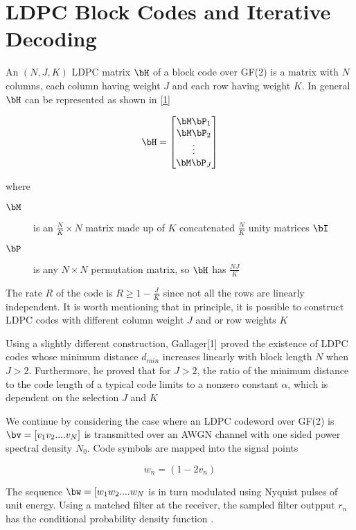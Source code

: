\documentclass[11pt, oneside, dvipdfmx]{book}
\begin{document}
\section{LDPC Block Codes and Iterative  Decoding}
An $(N,J,K)$ LDPC matrix $\bH$ of a block code over GF(2) is a matrix with $N$ columns, each column having weight $J$ and each row having weight $K$. In general 
$\bH$ can be represented as shown in \ref{1}



\begin{equation}
\bH
=
\begin{bmatrix}
    \bM \bP_{1} \\
    \bM \bP_{2}  \\
    \vdots  \\
    \bM \bP_{J} 
\end{bmatrix}
\label{1}
\end{equation}


where 
\begin{description}
\item [$\bM$] is an $\frac{N}{K} \times N$ matrix made up of $K$ concatenated $\frac{N}{K}$ unity matrices $\bI$
\item [$\bP$] is any $N \times N$ permutation matrix, so $\bH$ has $\frac{NJ}{K}$
\end{description}

The rate $R$ of the code is $R \geq 1- \frac{J}{K}$ since not all the rows are linearly independent. It is worth mentioning that in principle, it is possible to construct LDPC codes with different column weight $J$ and or row weights $K$

Using a slightly different construction, Gallager[1] proved the existence of LDPC codes whose minimum distance $d_{min}$ increases linearly with block length $N$ when $J>2$. Furthermore, he proved that
for $J > 2$, the ratio of the minimum distance to the code length of a
typical code limits to a nonzero constant $\alpha$, which is dependent on
the selection $J$ and $K$

We continue by considering the case where an LDPC codeword over GF(2) is $\bv=[v_1 v_2....v_N]$ is transmitted over an AWGN channel with one sided power spectral density $N_0$. Code symbols are mapped into the signal points

\begin{equation}
w_n=(1-2v_n)
\label{2}
\end{equation}

The sequence $\bw=[w_1 w_2....w_N$ is in turn modulated using Nyquist pulses of unit energy. Using a matched filter at the receiver, the sampled filter outpput $r_n$ has the conditional probability density function .
\end{document}
